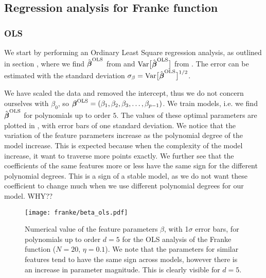     \subsection{Regression analysis for Franke function}\label{sec:reganalysis_franke}

        \subsubsection{OLS}\label{sec:olsanalysis}
            We start by performing an Ordinary Least Square regression analysis, as outlined in section , where we find $\hat{\boldsymbol{\beta}}^\text{OLS}$ from  and $\text{Var}\big[\hat{\boldsymbol{\beta}}^{\text{OLS}}\big]$ from . The error can be estimated with the standard deviation $\mathbf{\sigma}_{\beta} = \text{Var}\big[\hat{\boldsymbol{\beta}}^{\text{OLS}}\big]^{1/2}$. 

            We have scaled the data and removed the intercept, thus we do not concern ourselves with $\beta_0$, so $\boldsymbol{\beta}^{\text{OLS}} = (\beta_1, \beta_2, \beta_3, \dots, \beta_{p-1})$. We train models, i.e. we find $\hat{\boldsymbol{\beta}}^{\text{OLS}}$ for polynomials up to order $5$. The values of these optimal parameters are plotted in , with error bars of one standard deviation. We notice that the variation of the feature parameters increase as the polynomial degree of the model increase. This is expected because when the complexity of the model increase, it want to traverse more points exactly. We further see that the coefficients of the same features more or less have the same sign for the different polynomial degrees. This is a sign of a stable model, as we do not want these coefficient to change much when we use different polynomial degrees for our model. WHY??

            \begin{figure}
                \texttt{[image: franke/beta\_ols.pdf]}
                \caption{Numerical value of the feature parameters $\beta$, with 1$\sigma$ error bars, for polynomials up to order $d=5$ for the OLS analysis of the Franke function ($N=20$, $\eta=0.1$). We note that the parameters for similar features tend to have the same sign across models, however there is an increase in parameter magnitude. This is clearly visible for $d=5$. }
                \label{fig:beta_with_standard_deviation}
            \end{figure}

